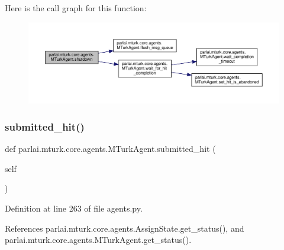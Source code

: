 Here is the call graph for this function\+:
\nopagebreak
\begin{figure}[H]
\begin{center}
\leavevmode
\includegraphics[width=350pt]{classparlai_1_1mturk_1_1core_1_1agents_1_1MTurkAgent_ad269775afaaa10dba0432080fba99b14_cgraph}
\end{center}
\end{figure}
\mbox{\label{classparlai_1_1mturk_1_1core_1_1agents_1_1MTurkAgent_a1bb274c3d2fbfbe79f095ef27b42d820}} 
\subsubsection{\texorpdfstring{submitted\+\_\+hit()}{submitted\_hit()}}
{\footnotesize\ttfamily def parlai.\+mturk.\+core.\+agents.\+M\+Turk\+Agent.\+submitted\+\_\+hit (\begin{DoxyParamCaption}\item[{}]{self }\end{DoxyParamCaption})}



Definition at line 263 of file agents.\+py.



References parlai.\+mturk.\+core.\+agents.\+Assign\+State.\+get\+\_\+status(), and parlai.\+mturk.\+core.\+agents.\+M\+Turk\+Agent.\+get\+\_\+status().

